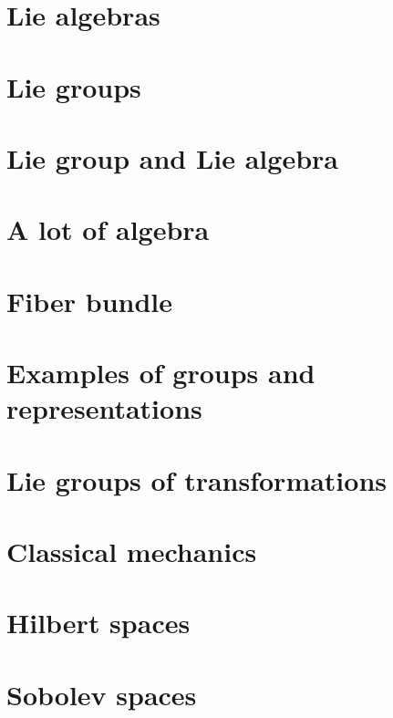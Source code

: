\documentclass[a4paper,twoside,11pt]{book}
\begin{document}
\chapter{Lie algebras}







\chapter{Lie groups}


\chapter{Lie group and Lie algebra}


\chapter{A lot of algebra}




\chapter{Fiber bundle}



\chapter{Examples of groups and representations}        \label{ChapThoComsGroupes}





\chapter{Lie groups of transformations}


\chapter{Classical mechanics}


\chapter{Hilbert spaces}



\chapter{Sobolev spaces}

\end{document}
